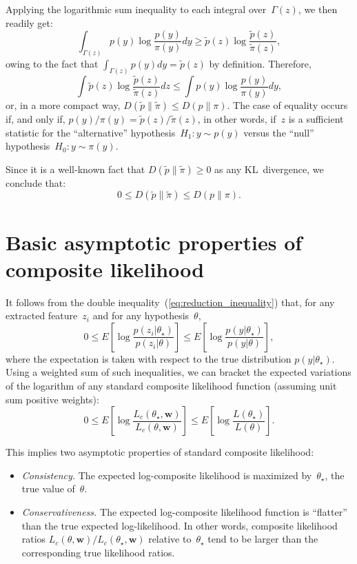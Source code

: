 \documentclass[english]{scrartcl}
\begin{document}
Applying the logarithmic sum inequality \cite{Cover-06} to each integral over~$\Gamma(z)$, we then readily get:
$$
\int_{\Gamma(z)} p(y) \log \frac{p(y)}{\pi(y)} dy
\geq 
\tilde{p}(z) \log \frac{\tilde{p}(z)}{\tilde{\pi}(z)}
,
$$
owing to the fact that $\displaystyle \int_{\Gamma(z)} p(y) dy = \tilde{p}(z)$ by definition. Therefore,
$$
\int \tilde{p}(z) \log \frac{\tilde{p}(z)}{\tilde{\pi}(z)} dz
\leq 
\int p(y) \log \frac{p(y)}{\pi(y)} dy
,
$$
or, in a more compact way, $D(\tilde{p}\|\tilde{\pi})\leq D(p\|\pi)$. The case of equality occurs if, and only if, $p(y)/\pi(y)=\tilde{p}(z)/\tilde{\pi}(z)$, in other words, if~$z$ is a sufficient statistic for the ``alternative'' hypothesis~$H_1:y\sim p(y)$ versus the ``null'' hypothesis~$H_0:y\sim\pi(y)$. 

Since it is a well-known fact that $D(\tilde{p}\|\tilde{\pi})\geq 0$ as any KL~divergence, we conclude that:
\begin{equation}
\label{eq:reduction_inequality}
0 
\leq D(\tilde{p}\|\tilde{\pi}) 
\leq D(p\|\pi)
.
\end{equation}


\section{Basic asymptotic properties of composite likelihood}
\label{sec:asymptotic}

It follows from the double inequality~(\ref{eq:reduction_inequality}) that, for any extracted feature~$z_i$ and for any hypothesis~$\theta$,
$$
0 \leq
E\left[
\log \frac{p(z_i|\theta_\star)}{p(z_i|\theta)}
\right]
\leq
E\left[
\log \frac{p(y|\theta_\star)}{p(y|\theta)}
\right],
$$
where the expectation is taken with respect to the true distribution $p(y|\theta_\star)$. Using a weighted sum of such inequalities, we can bracket the expected variations of the logarithm of any standard composite likelihood function (assuming unit sum positive weights):
\begin{equation}
\label{eq:variation_bound}
0 \leq
E\left[ \log \frac{L_c(\theta_\star, \mathbf{w})}{L_c(\theta, \mathbf{w})} \right]
\leq 
E\left[ \log \frac{L(\theta_\star)}{L(\theta)} \right]
.
\end{equation}

This implies two asymptotic properties of standard composite likelihood: 
\begin{itemize}
\item {\em Consistency.} The expected log-composite likelihood is maximized by~$\theta_\star$, the true value of~$\theta$.
\item {\em Conservativeness.} The expected log-composite likelihood function is ``flatter'' than the true expected log-likelihood. In other words, composite likelihood ratios $L_c(\theta, \mathbf{w})/L_c(\theta_\star, \mathbf{w})$ relative to~$\theta_\star$ tend to be larger than the corresponding true likelihood ratios. 
\end{itemize}
\end{document}
